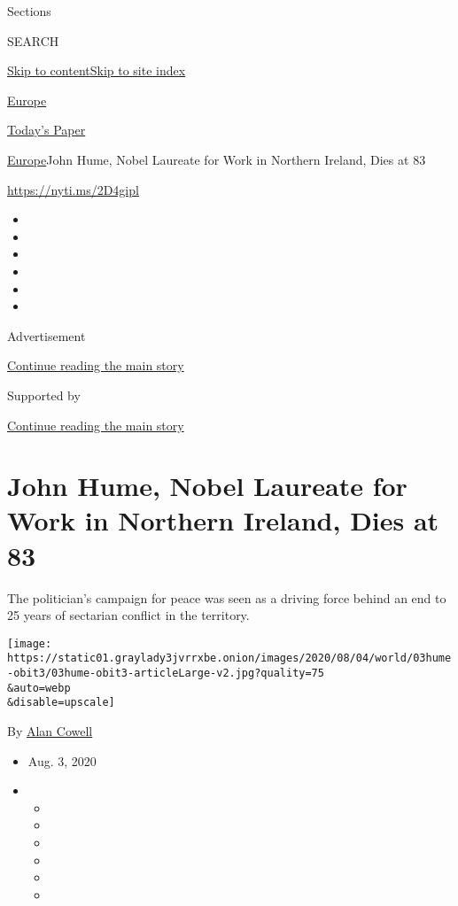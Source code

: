 Sections

SEARCH

\protect\hyperlink{site-content}{Skip to
content}\protect\hyperlink{site-index}{Skip to site index}

\href{https://www.nytimes3xbfgragh.onion/section/world/europe}{Europe}

\href{https://myaccount.nytimes3xbfgragh.onion/auth/login?response_type=cookie\&client_id=vi}{}

\href{https://www.nytimes3xbfgragh.onion/section/todayspaper}{Today's
Paper}

\href{/section/world/europe}{Europe}\textbar{}John Hume, Nobel Laureate
for Work in Northern Ireland, Dies at 83

\url{https://nyti.ms/2D4gipl}

\begin{itemize}
\item
\item
\item
\item
\item
\item
\end{itemize}

Advertisement

\protect\hyperlink{after-top}{Continue reading the main story}

Supported by

\protect\hyperlink{after-sponsor}{Continue reading the main story}

\hypertarget{john-hume-nobel-laureate-for-work-in-northern-ireland-dies-at-83}{%
\section{John Hume, Nobel Laureate for Work in Northern Ireland, Dies at
83}\label{john-hume-nobel-laureate-for-work-in-northern-ireland-dies-at-83}}

The politician's campaign for peace was seen as a driving force behind
an end to 25 years of sectarian conflict in the territory.

\texttt{[image: https://static01.graylady3jvrrxbe.onion/images/2020/08/04/world/03hume-obit3/03hume-obit3-articleLarge-v2.jpg?quality=75\\\&auto=webp\\\&disable=upscale]}

By \href{https://www.nytimes3xbfgragh.onion/by/alan-cowell}{Alan Cowell}

\begin{itemize}
\item
  Aug. 3, 2020
\item
  \begin{itemize}
  \item
  \item
  \item
  \item
  \item
  \item
  \end{itemize}
\end{itemize}

